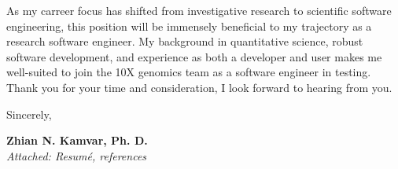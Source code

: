 \vspace{1ex}

As my carreer focus has shifted from investigative research to scientific
software engineering, this position will be immensely beneficial to my
trajectory as a research software engineer. My background in quantitative
science, robust software development, and experience as both a developer and 
user makes me well-suited to join the 10X genomics team as a software engineer
in testing. Thank you for your time and consideration, I look forward to
hearing from you. 

\vspace{2ex}

Sincerely,

\vspace{5ex}

\textbf{Zhian N. Kamvar, Ph. D.}\\
\textit{Attached: Resum\'{e}, references}













\clearpage
